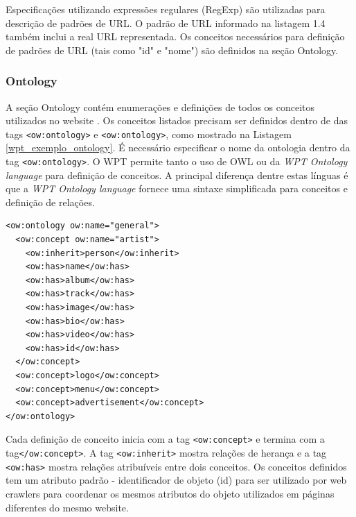Especificações utilizando expressões regulares (RegExp) são utilizadas para descrição de padrões de URL. O padrão de URL informado na listagem 1.4 também inclui a real URL representada. Os conceitos necessários para definição de padrões de URL (tais como "id" e "nome") são definidos na seção Ontology.

\subsubsection{Ontology}

A seção Ontology contém enumerações e definições de todos os conceitos utilizados no website \cite{wpt}. Os conceitos listados precisam ser definidos dentro de das tags \texttt{<ow:ontology>} e \texttt{<ow:ontology>}, como mostrado na Listagem \ref{wpt_exemplo_ontology}. É necessário especificar o nome da ontologia dentro da tag \texttt{<ow:ontology>}. O WPT permite tanto o uso de OWL ou da \emph{WPT Ontology language} para definição de conceitos. A principal diferença dentre estas línguas é que a \emph{WPT Ontology language} fornece uma sintaxe simplificada para conceitos e definição de relações.

\begin{lstlisting}[label=wpt_exemplo_ontology]
<ow:ontology ow:name="general">
  <ow:concept ow:name="artist">
    <ow:inherit>person</ow:inherit>
    <ow:has>name</ow:has>
    <ow:has>album</ow:has>
    <ow:has>track</ow:has>
    <ow:has>image</ow:has>
    <ow:has>bio</ow:has>
    <ow:has>video</ow:has>
    <ow:has>id</ow:has>
  </ow:concept>
  <ow:concept>logo</ow:concept>
  <ow:concept>menu</ow:concept>
  <ow:concept>advertisement</ow:concept>
</ow:ontology>
\end{lstlisting}

Cada definição de conceito inicia com a tag \texttt{<ow:concept>} e termina com a tag\texttt{</ow:concept>}. A tag \texttt{<ow:inherit>} mostra relações de herança e a tag \texttt{<ow:has>} mostra relações atribuíveis entre dois conceitos. Os conceitos definidos tem um atributo padrão - identificador de objeto (id) para ser utilizado por web crawlers para coordenar os mesmos atributos do objeto utilizados em páginas diferentes do mesmo website.
